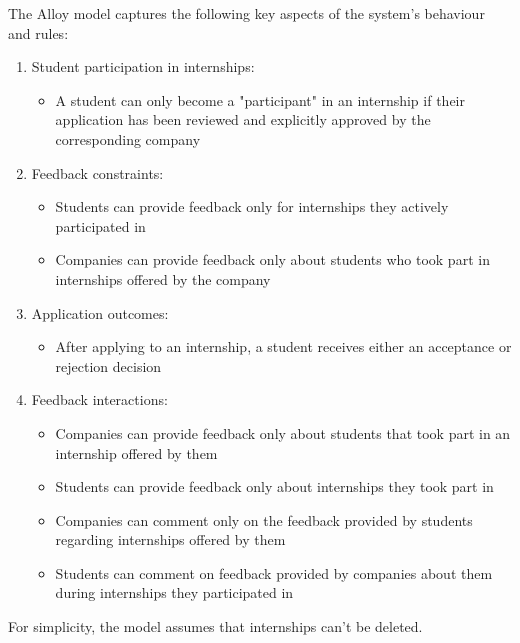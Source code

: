 The Alloy model captures the following key aspects of the system's behaviour and rules:
\begin{enumerate}
    \item Student participation in internships:
    \begin{itemize}
        \item A student can only become a "participant" in an internship if their application has been reviewed and explicitly approved by the corresponding company
    \end{itemize}
    \item Feedback constraints:
    \begin{itemize}
        \item Students can provide feedback only for internships they actively participated in
        \item  Companies can provide feedback only about students who took part in internships offered by the company
    \end{itemize}
    \item Application outcomes:
    \begin{itemize}
        \item  After applying to an internship, a student receives either an acceptance or rejection decision
    \end{itemize}
    \item Feedback interactions:
    \begin{itemize}
        \item Companies can provide feedback only about students that took part in an internship offered by them
        \item Students can provide feedback only about internships they took part in
        \item Companies can comment only on the feedback provided by students regarding internships offered by them
        \item Students can comment on feedback provided by companies about them during internships they participated in
    \end{itemize}
\end{enumerate}
For simplicity, the model assumes that internships can't be deleted.
    
